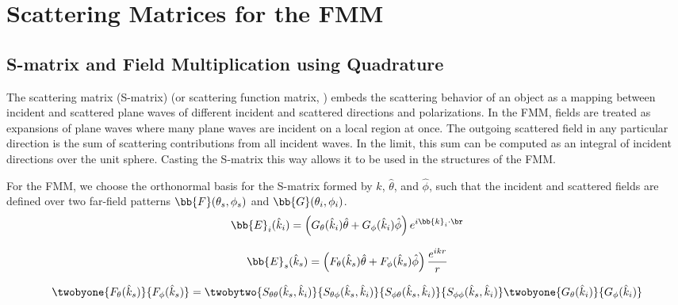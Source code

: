 \clearpage
\newpage

\section{Scattering Matrices for the FMM}

\subsection{S-matrix and Field Multiplication using Quadrature}

The scattering matrix (S-matrix) (or scattering function matrix, \cite{tsang2000scattering}) embeds the scattering behavior of an object as a mapping between incident and scattered plane waves of different incident and scattered directions and polarizations. In the FMM, fields are treated as expansions of plane waves where many plane waves are incident on a local region at once. The outgoing scattered field in any particular direction is the sum of scattering contributions from all incident waves. In the limit, this sum can be computed as an integral of incident directions over the unit sphere. Casting the  S-matrix this way allows it to be used in the structures of the FMM.  

For the FMM, we choose the orthonormal basis for the S-matrix formed by $\hat{k}$, $\hat{\theta}$, and $\hat{\phi}$, such that the incident and scattered fields are defined over two far-field patterns $\bb{F}(\theta_s,\phi_s)$ and $\bb{G}(\theta_i,\phi_i)$. \begin{equation}
\bb{E}_i(\hat{k}_i) = \left(G_{\theta}(\hat{k}_i)\hat{\theta}  +G_{\phi}(\hat{k}_i) \hat{\phi} \right) e^{i\bb{k}_i \cdot \br}
\end{equation}

\begin{equation}
\bb{E}_s(\hat{k}_s) = \left( F_{\theta}(\hat{k}_s)\hat{\theta} +  F_{\phi}(\hat{k}_s)\hat{\phi}\right) \dfrac{ e^{i k r}}{r}
\end{equation}
 
\begin{equation}
\twobyone{F_{\theta}(\hat{k}_s)}{F_{\phi}(\hat{k}_s)} = 
\twobytwo
{S_{\theta\theta}(\hat{k}_s,\hat{k}_i) }
{S_{\theta\phi}(\hat{k}_s,\hat{k}_i) }
{S_{\phi\theta}(\hat{k}_s,\hat{k}_i) }
{S_{\phi\phi}(\hat{k}_s,\hat{k}_i) }   
\twobyone{G_{\theta}(\hat{k}_i)}{G_{\phi}(\hat{k}_i)} 
\end{equation}

 
